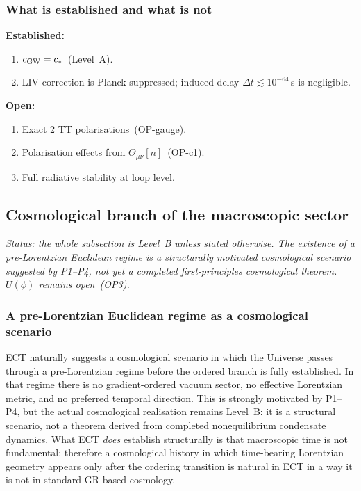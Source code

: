 \subsubsection*{What is established and what is not}

\textbf{Established:}
\begin{enumerate}[label=(\roman*)]
  \item $c_{\rm GW}=c_*$~(Level~A).
  \item LIV correction is Planck-suppressed; induced delay
    $\Delta t\lesssim10^{-64}$\,s is negligible.
\end{enumerate}

\textbf{Open:}
\begin{enumerate}[label=(\roman*)]
  \item Exact 2 TT polarisations~(OP-gauge).
  \item Polarisation effects from $\Theta_{\mu\nu}[n]$~(OP-c1).
  \item Full radiative stability at loop level.
\end{enumerate}

\subsection{Cosmological branch of the macroscopic sector}
\label{sec:mp_cosmo}

\textit{Status: the whole subsection is Level~B unless stated
otherwise. The existence of a pre-Lorentzian Euclidean regime is a
structurally motivated cosmological scenario suggested by P1--P4, not
yet a completed first-principles cosmological theorem. $U(\phi)$
remains open~(OP3).}

\subsubsection*{A pre-Lorentzian Euclidean regime as a cosmological
scenario}

ECT naturally suggests a cosmological scenario in which the Universe
passes through a pre-Lorentzian regime before the ordered branch is
fully established.
In that regime there is no gradient-ordered vacuum sector, no effective
Lorentzian metric, and no preferred temporal direction.
This is strongly motivated by P1--P4, but the actual cosmological
realisation remains Level~B:
it is a structural scenario, not a theorem derived from completed
nonequilibrium condensate dynamics.
What ECT \emph{does} establish structurally is that macroscopic time is
not fundamental; therefore a cosmological history in which
time-bearing Lorentzian geometry appears only after the ordering
transition is natural in ECT in a way it is not in standard
GR-based cosmology.


